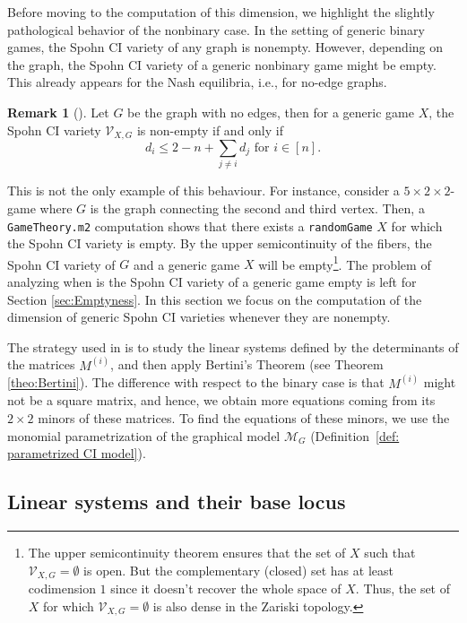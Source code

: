 \documentclass[11pt]{amsart}
\numberwithin{equation}{section}
\theoremstyle{plain}
\numberwithin{theorem}{section}
\theoremstyle{definition}
\newtheorem{remark}[theorem]{Remark}
\begin{document}
Before moving to the computation of this dimension, we highlight the slightly pathological behavior of the nonbinary case. In the setting of generic binary games,  the Spohn CI variety of any graph is nonempty. However, depending on the graph, the Spohn CI variety of a generic nonbinary game might be empty. This already appears for the Nash equilibria, i.e., for no-edge graphs. 

\begin{remark}[{\cite[Theorem 2.7]{abo2025vector}}]\label{rem: nash emptyness}
    Let $G$ be the graph with no edges, then for a generic game $X$, the Spohn CI variety $\mathcal{V}_{X,G}$ is non-empty if and only if
    \[
    d_i\leq 2-n+\sum_{j\neq i} d_j \text{ for } i\in[n].
    \]
\end{remark}

\noindent This is not the only example of this behaviour. For instance, consider a $5 \times 2 \times 2$-game where $G$ is the graph connecting the second and third vertex. Then, a \texttt{GameTheory.m2} \cite{connelly2025gametheory} computation shows that there exists a \texttt{randomGame} $X$ for which the Spohn CI variety is empty. By the upper semicontinuity of the fibers, the Spohn CI variety of $G$ and a generic game $X$ will be empty\footnote{The upper semicontinuity theorem ensures that the set of $X$ such that $\mathcal V_{X,G}=\emptyset$ is open.  But the complementary (closed) set has at least codimension $1$ since it doesn't recover the whole space of $X$. Thus, the set of $X$ for which $\mathcal V_{X,G}=\emptyset$ is also dense in the Zariski topology.}. 
The problem of analyzing when is the Spohn CI variety of a generic game empty is left for Section \ref{sec:Emptyness}. In this section we focus on the computation of the dimension of generic Spohn CI varieties whenever they are nonempty.

The strategy used in \cite[Section 3]{portakal2024game} 
is to study the linear systems defined by the determinants of the matrices $M^{(i)}$, and then apply Bertini's Theorem (see Theorem \ref{theo:Bertini}). The difference with respect to the binary case is that $M^{(i)}$ might not be a square matrix, and hence, we obtain more equations coming from its $2\times 2$ minors of these matrices. To find the equations of these minors, we use the monomial parametrization of the graphical model $\mathcal{M}_G$ (Definition~\ref{def: parametrized CI model}).
\subsection{Linear systems and their base locus}\label{subsec:base locus}
\end{document}
